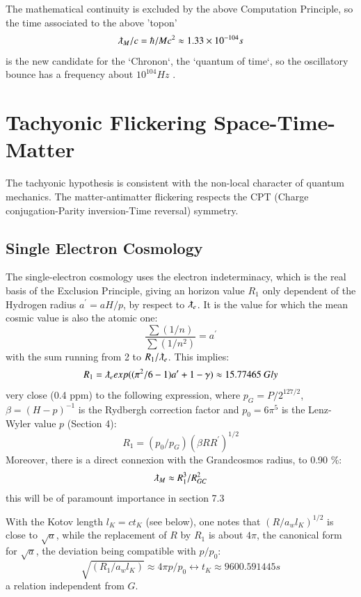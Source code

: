 \documentclass[twoside,draft]{article}
\begin{document}
\begin{sloppypar}
The mathematical continuity is excluded by the above Computation Principle, so the time associated
to the above 'topon' 
$$\lambdabar_{M} /c = \hbar/Mc^2 \approx 1.33 \times 10^{-104}s$$
is the new candidate for the `Chronon`, the `quantum of time`, so the
oscillatory bounce has a frequency about $10^{104}Hz $ \cite{Sanchez2}.

\section{Tachyonic Flickering Space-Time-Matter}

The tachyonic hypothesis is consistent with the non-local character of quantum mechanics. The
matter-antimatter flickering respects the CPT (Charge conjugation-Parity inversion-Time reversal) symmetry.

\subsection{Single Electron Cosmology}

The single-electron cosmology \cite{Sanchez1} uses the electron indeterminacy, which is the real basis of the
Exclusion Principle, giving an horizon value $R_1$ only dependent of the Hydrogen radius $a^{\prime} = aH/p$, by respect to $\lambdabar_e$. 
It is the value for which the mean cosmic value is also the atomic one:
\begin{equation}
\frac{\sum(1/n)}{\sum(1/n^{2})} = a^{\prime}
\end{equation}
with the sum running from 2 to $R_{1} /\lambdabar_{e}$. This implies:
$$
R_{1} = \lambdabar_{e} exp((\pi^{2} /6 - 1)a^{\prime} + 1 - \gamma) \approx 15.77465 ~ Gly
$$
very close (0.4 ppm) to the following expression, where $p_{G} = P/2^{127/2}$, $\beta = (H - p)^{-1}$ is the
Rydbergh correction factor and $p_{0} = 6\pi^{5}$ is the Lenz-Wyler value $p$ (Section 4):
$$
R_{1} = ( p_{0} /p_{G} )(\beta R R^{\prime})^{1/2}
$$
Moreover, there is a direct connexion with the Grandcosmos radius, to 0.90 \%:
\begin{equation}
\lambdabar_M  \approx R_1^3/R_{GC}^2
\end{equation}
this will be of paramount importance in section 7.3

With the Kotov length $l_{K} = ct_{K}$ (see below), one notes that $(R/a_w l_K)^{1/2} $ is close to $\sqrt{a}$, while
the replacement of $R$ by $R_{1}$ is about $4\pi$, the canonical form for $\sqrt{a}$, the deviation being compatible
with $p/p_{0}$:
$$\sqrt{(R_{1} /a_{w} l_{K})} \approx 4\pi p/p_{0} \leftrightarrow t_{K} \approx 9 600.591445 s$$ a relation independent from $G$. 


\end{sloppypar}
\end{document}
